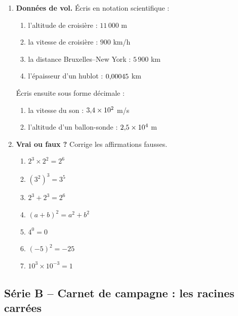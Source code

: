 \documentclass[../main.tex]{subfiles}
\begin{document}
\begin{enumerate}[label=\textbf{\arabic*.}]
\item \textbf{Données de vol.} Écris en notation scientifique :
\begin{enumerate}[label=\alph*)]
  \item l'altitude de croisière : $11\,000$ m \qquad
  \item la vitesse de croisière : $900$ km/h \qquad
  \item la distance Bruxelles--New York : $5\,900$ km \qquad
  \item l'épaisseur d'un hublot : $0{,} 00045$ km
\end{enumerate}
Écris ensuite sous forme décimale :
\begin{enumerate}[label=\alph*),resume*]
  \item la vitesse du son : $3{,} 4 \times 10^2$ m/s \qquad
  \item l'altitude d'un ballon-sonde : $2{,} 5 \times 10^4$ m
\end{enumerate}

\item \textbf{Vrai ou faux ?} Corrige les affirmations fausses.
\begin{enumerate}[label=\alph*)]
  \item $2^3 \times 2^2 = 2^6$ \qquad
  \item $(3^2)^3 = 3^5$ \qquad
  \item $2^3 + 2^3 = 2^6$ \qquad
  \item $(a+b)^2 = a^2 + b^2$ \qquad
  \item $4^0 = 0$ \qquad
  \item $(-5)^2 = -25$ \qquad
  \item $10^3 \times 10^{-3} = 1$
\end{enumerate}

\end{enumerate}

\subsection{Série B -- Carnet de campagne : les racines carrées}
\end{document}
